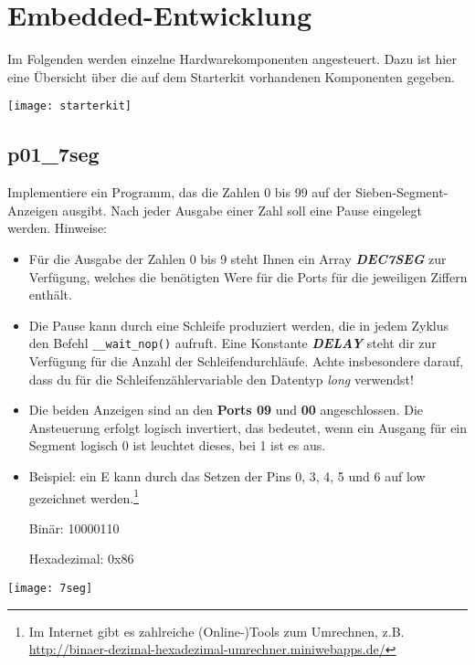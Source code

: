 \documentclass[
  accentcolor=tud1c,	%
  colorbacktitle,		%
  inverttitle,			%
  german,				%
  twoside
]{tudexercise}
\begin{document}
\section{Embedded-Entwicklung}

Im Folgenden werden einzelne Hardwarekomponenten angesteuert. Dazu ist hier eine Übersicht über die auf dem Starterkit vorhandenen Komponenten gegeben.
\begin{center}\texttt{[image: starterkit]}\end{center}

\subsection{p01\_7seg}
\label{exercise7Segment}

Implementiere ein Programm, das die Zahlen 0 bis 99 auf der Sieben-Segment-Anzeigen ausgibt.
Nach jeder Ausgabe einer Zahl soll eine Pause eingelegt werden.
Hinweise:\begin{itemize}
\item 
Für die Ausgabe der Zahlen 0 bis 9 steht Ihnen ein Array \textbf{\emph{DEC7SEG}} zur Verfügung, welches die benötigten Were für die Ports für die jeweiligen Ziffern enthält.

\item 
Die Pause kann durch eine Schleife produziert werden, die in jedem Zyklus den Befehl \texttt{\_\_wait\_nop()} aufruft.
Eine Konstante \textbf{\emph{DELAY}} steht dir zur Verfügung für die Anzahl der Schleifendurchläufe.
Achte insbesondere darauf, dass du für die Schleifenzählervariable den Datentyp \emph{long} verwendst!

\item
Die beiden Anzeigen sind an den \textbf{Ports 09} und \textbf{00} angeschlossen.
Die Ansteuerung erfolgt logisch invertiert, das bedeutet, wenn ein Ausgang für ein Segment logisch 0 ist leuchtet dieses, bei 1 ist es aus.

\item
Beispiel: ein \glqq{}E\grqq{} kann durch das Setzen der Pins 0, 3, 4, 5 und 6 auf low gezeichnet werden.\footnote{
	Im Internet gibt es zahlreiche (Online-)Tools zum Umrechnen, z.B. 
	\url{http://binaer-dezimal-hexadezimal-umrechner.miniwebapps.de/}
}

\quad Binär: 10000110

\quad Hexadezimal: 0x86
\end{itemize}
\begin{center}\texttt{[image: 7seg]}\end{center}
\end{document}
